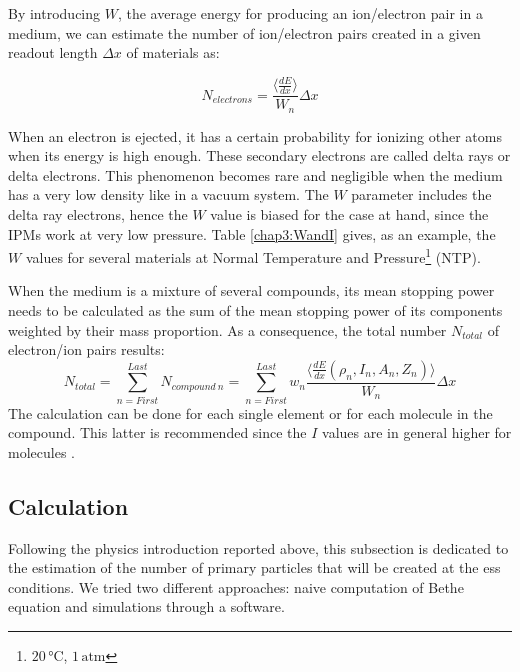 \begin{refsection}
  By introducing \(W\), the average energy for producing an ion/electron pair in a medium, we can estimate the number of ion/electron pairs created in a given readout length $\Delta x$ of materials \cite{Weiss1955,Bichsel1979} as:

  \begin{equation}
    N_{electrons}= \frac{\big \langle \frac{dE}{dx} \big \rangle}{W_{n}} \Delta x
  \end{equation}

  When an electron is ejected, it has a certain probability for ionizing other atoms when its energy is high enough. These secondary electrons are called delta rays or delta electrons. This phenomenon becomes rare and negligible when the medium has a very low density like in a vacuum system. The \(W\) parameter includes the delta ray electrons, hence the \(W\) value is biased \cite[p. 470]{Tanabashi2018} for the case at hand, since the IPMs work at very low pressure. Table \ref{chap3:WandI} gives, as an example, the \(W\) values for several materials at Normal Temperature and Pressure\footnote{$20\,\mathrm{°C}$, $1\,\mathrm{atm}$} (NTP).

  

  When the medium is a mixture of several compounds, its mean stopping power needs to be calculated as the sum of the mean stopping power of its components weighted by their mass proportion. As a consequence, the total number $N_{total}$ of electron/ion pairs results:
  \begin{equation}
    N_{total}= \sum_{n= First}^{Last} N_{compound\ n}= \sum_{n= First}^{Last} w_{n} \frac{\big \langle \frac{dE}{dx}\left(\rho_{n},I_{n},A_{n},Z_{n}\right) \big \rangle}{W_{n}} \Delta x
  \end{equation}
  The calculation can be done for each single element or for each molecule in the compound.
  This latter is recommended since the \(I\) values are in general higher for molecules \cite[p. 451]{Tanabashi2018}.

  \subsection{Calculation}
  \label{chap3:calc}
  Following the physics introduction reported above, this subsection is dedicated to the estimation of the number of primary particles that will be created at the \acrshort{ess} conditions. We tried two different approaches: naive computation of Bethe equation and simulations through a software.


\end{refsection}
